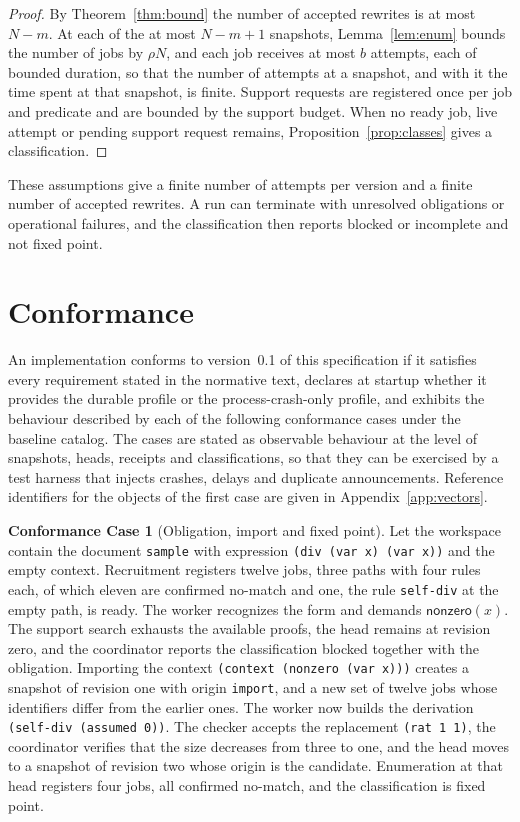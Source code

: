 \documentclass[11pt,a4paper]{article}
\theoremstyle{plain}
\theoremstyle{definition}
\theoremstyle{remark}
\theoremstyle{definition}
\newtheorem{case}{Conformance Case}
\newcommand{\nz}{\mathsf{nonzero}}
\newcommand{\code}[1]{\texttt{#1}}
\begin{document}
\begin{proof}
By Theorem~\ref{thm:bound} the number of accepted rewrites is at most $N - m$. At each of the at most $N - m + 1$ snapshots, Lemma~\ref{lem:enum} bounds the number of jobs by $\rho N$, and each job receives at most $b$ attempts, each of bounded duration, so that the number of attempts at a snapshot, and with it the time spent at that snapshot, is finite. Support requests are registered once per job and predicate and are bounded by the support budget. When no ready job, live attempt or pending support request remains, Proposition~\ref{prop:classes} gives a classification.
\end{proof}

These assumptions give a finite number of attempts per version and a finite number of accepted rewrites. A run can terminate with unresolved obligations or operational failures, and the classification then reports blocked or incomplete and not fixed point.

\section{Conformance}
\label{sec:conformance}

An implementation conforms to version~0.1 of this specification if it satisfies every requirement stated in the normative text, declares at startup whether it provides the durable profile or the process-crash-only profile, and exhibits the behaviour described by each of the following conformance cases under the baseline catalog. The cases are stated as observable behaviour at the level of snapshots, heads, receipts and classifications, so that they can be exercised by a test harness that injects crashes, delays and duplicate announcements. Reference identifiers for the objects of the first case are given in Appendix~\ref{app:vectors}.

\begin{case}[Obligation, import and fixed point]
Let the workspace contain the document \code{sample} with expression \code{(div (var x) (var x))} and the empty context. Recruitment registers twelve jobs, three paths with four rules each, of which eleven are confirmed no-match and one, the rule \code{self-div} at the empty path, is ready. The worker recognizes the form and demands $\nz(x)$. The support search exhausts the available proofs, the head remains at revision zero, and the coordinator reports the classification blocked together with the obligation. Importing the context \code{(context (nonzero (var x)))} creates a snapshot of revision one with origin \code{import}, and a new set of twelve jobs whose identifiers differ from the earlier ones. The worker now builds the derivation \code{(self-div (assumed 0))}. The checker accepts the replacement \code{(rat 1 1)}, the coordinator verifies that the size decreases from three to one, and the head moves to a snapshot of revision two whose origin is the candidate. Enumeration at that head registers four jobs, all confirmed no-match, and the classification is fixed point.
\end{case}
\end{document}
